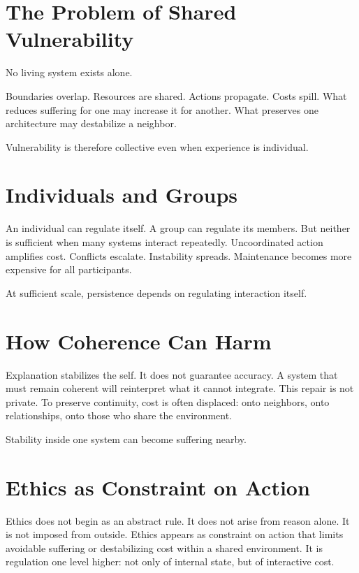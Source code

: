 \documentclass[11pt,twoside,openright]{book}
\begin{document}
\section*{The Problem of Shared Vulnerability}

No living system exists alone.

Boundaries overlap. Resources are shared. Actions propagate. Costs spill. What reduces suffering for one may increase it for another. What preserves one architecture may destabilize a neighbor.

Vulnerability is therefore collective even when experience is individual.

\section*{Individuals and Groups}

An individual can regulate itself. A group can regulate its members. But neither is sufficient when many systems interact repeatedly. Uncoordinated action amplifies cost. Conflicts escalate. Instability spreads. Maintenance becomes more expensive for all participants.

At sufficient scale, persistence depends on regulating interaction itself.

\section*{How Coherence Can Harm}

Explanation stabilizes the self. It does not guarantee accuracy. A system that must remain coherent will reinterpret what it cannot integrate. This repair is not private. To preserve continuity, cost is often displaced: onto neighbors, onto relationships, onto those who share the environment.

Stability inside one system can become suffering nearby.

\section*{Ethics as Constraint on Action}

Ethics does not begin as an abstract rule. It does not arise from reason alone. It is not imposed from outside. Ethics appears as constraint on action that limits avoidable suffering or destabilizing cost within a shared environment. It is regulation one level higher: not only of internal state, but of interactive cost.
\end{document}
